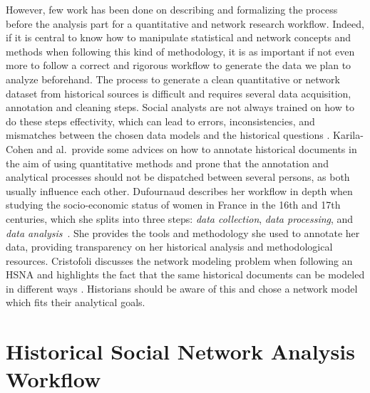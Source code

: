 However, few work has been done on describing and formalizing the process before the analysis part for a quantitative and network research workflow.
Indeed, if it is central to know how to manipulate statistical and network concepts and methods when following this kind of methodology, it is as important if not even more to follow a correct and rigorous workflow to generate the data we plan to analyze beforehand.
The process to generate a clean quantitative or network dataset from historical sources is difficult and requires several data acquisition, annotation and cleaning steps.
Social analysts are not always trained on how to do these steps effectivity, which can lead to errors, inconsistencies, and mismatches between the chosen data models and the historical questions \cite{alkadi2022}.
Karila-Cohen and al.\ provide some advices on how to annotate historical documents in the aim of using quantitative methods \cite{karila-cohenNouvellesCuisinesHistoire2018} and prone that the annotation and analytical processes should not be dispatched between several persons, as both usually influence each other.
Dufournaud describes her workflow in depth when studying the socio-economic status of women in France in the 16th and 17th centuries, which she splits into three steps: \textit{data collection}, \textit{data processing}, and \textit{data analysis}~\cite{dufournaudCommentRendreVisible2018}.
She provides the tools and methodology she used to annotate her data, providing transparency on her historical analysis and methodological resources.
Cristofoli discusses the network modeling problem when following an HSNA and highlights the fact that the same historical documents can be modeled in different ways \cite{cristofoliAuxSourcesGrands2008}.
Historians should be aware of this and chose a network model which fits their analytical goals.




\section{Historical Social Network Analysis Workflow}

